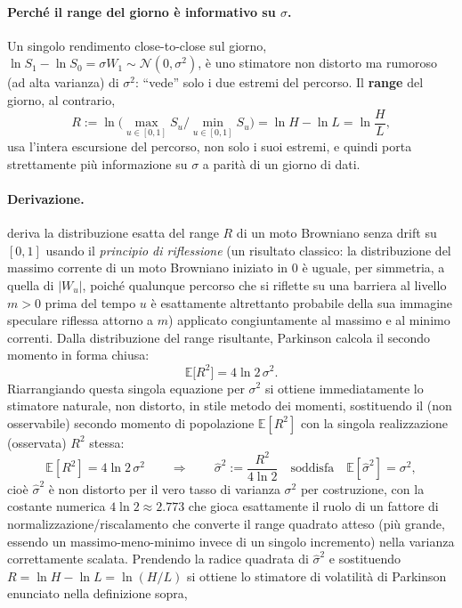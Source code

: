\documentclass[11pt]{article}
\theoremstyle{definition}
\theoremstyle{remark}
\begin{document}
\paragraph{Perch\'e il range del giorno \`e informativo su $\sigma$.} Un singolo rendimento close-to-close sul giorno, $\ln S_1-\ln S_0=\sigma W_1\sim\mathcal N(0,\sigma^2)$, \`e uno stimatore non distorto ma rumoroso (ad alta varianza) di $\sigma^2$: ``vede'' solo i due estremi del percorso. Il \textbf{range} del giorno, al contrario,
\[
R := \ln\!\Big(\max_{u\in[0,1]}S_u\Big/\min_{u\in[0,1]}S_u\Big) = \ln H-\ln L = \ln\frac{H}{L},
\]
usa l'intera escursione del percorso, non solo i suoi estremi, e quindi porta strettamente pi\`u informazione su $\sigma$ a parit\`a di un giorno di dati.

\paragraph{Derivazione.} \cite{parkinson1980} deriva la distribuzione esatta del range $R$ di un moto Browniano senza drift su $[0,1]$ usando il \emph{principio di riflessione} (un risultato classico: la distribuzione del massimo corrente di un moto Browniano iniziato in $0$ \`e uguale, per simmetria, a quella di $|W_u|$, poich\'e qualunque percorso che si riflette su una barriera al livello $m>0$ prima del tempo $u$ \`e esattamente altrettanto probabile della sua immagine speculare riflessa attorno a $m$) applicato congiuntamente al massimo e al minimo correnti. Dalla distribuzione del range risultante, Parkinson calcola il secondo momento in forma chiusa:
\[
\mathbb{E}\big[R^2\big] = 4\ln 2\,\sigma^2.
\]
Riarrangiando questa singola equazione per $\sigma^2$ si ottiene immediatamente lo stimatore naturale, non distorto, in stile metodo dei momenti, sostituendo il (non osservabile) secondo momento di popolazione $\mathbb{E}[R^2]$ con la singola realizzazione (osservata) $R^2$ stessa:
\[
\mathbb{E}[R^2]=4\ln2\,\sigma^2 \qquad\Longrightarrow\qquad \widehat{\sigma}^2 := \frac{R^2}{4\ln2} \quad\text{soddisfa}\quad \mathbb{E}[\widehat\sigma^2]=\sigma^2,
\]
cio\`e $\widehat\sigma^2$ \`e non distorto per il vero tasso di varianza $\sigma^2$ per costruzione, con la costante numerica $4\ln2\approx2.773$ che gioca esattamente il ruolo di un fattore di normalizzazione/riscalamento che converte il range quadrato atteso (pi\`u grande, essendo un massimo-meno-minimo invece di un singolo incremento) nella varianza correttamente scalata. Prendendo la radice quadrata di $\widehat\sigma^2$ e sostituendo $R=\ln H-\ln L=\ln(H/L)$ si ottiene lo stimatore di volatilit\`a di Parkinson enunciato nella definizione sopra,
\end{document}
